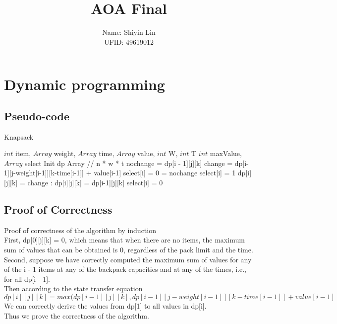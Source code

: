 \documentclass{article}
\title{AOA Final}
\author{Name: Shiyin Lin \\UFID: 49619012}
\date{}
\begin{document}
\maketitle

\section{Dynamic programming}
\subsection{Pseudo-code}
\begin{algorithm}
    \caption{Knapsack}
    \begin{algorithmic}[1] 
        \Require $int$ item, $Array$ weight, $Array$ time, $Array$ value, $int$ W, $int$ T
        \Ensure $int$ maxValue, $Array$ select
            \State Init dp Array // n * w * t
                            \State nochange = dp[i - 1][j][k]
                            \State change = dp[i-1][j-weight[i-1]][k-time[i-1]] + value[i-1]
                                \State select[i] = 0
                                \State [i][j][k] = nochange
                            \Else
                                \State select[i] = 1
                                \State dp[i][j][k] = change
                            \EndIf
                        \Else:
                            \State dp[i][j][k] = dp[i-1][j][k]
                            \State select[i] = 0
                        \EndIf
                    \EndFor
                \EndFor
            \EndFor
            \State {}
        \EndFunction
    \end{algorithmic}  
\end{algorithm} 
\clearpage
\subsection{Proof of Correctness}
Proof of correctness of the algorithm by induction\\
First, dp[0][j][k] = 0, which means that when there are no items, the maximum sum of values that can be obtained is 0, regardless of the pack limit and the time.
Second, suppose we have correctly computed the maximum sum of values for any of the i - 1 items at any of the backpack capacities and at any of the times, i.e., for all dp[i - 1].\\
Then according to the state transfer equation
$$
dp[i][j][k] = max(dp[i - 1][j][k], dp[i-1][j - weight[i-1]][k - time[i-1]] + value[i-1]
$$
We can correctly derive the values from dp[1] to all values in dp[i].\\
Thus we prove the correctness of the algorithm.
\end{document}
